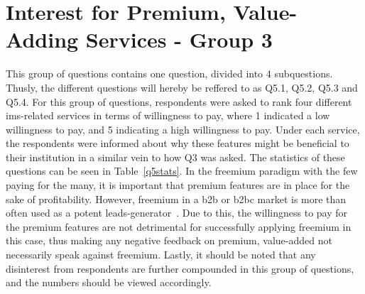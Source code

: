 \section{Interest for Premium, Value-Adding Services - Group 3}
This group of questions contains one question, divided into 4 subquestions. Thusly, the different questions will hereby be reffered to as Q5.1, Q5.2, Q5.3 and Q5.4. For this group of questions, respondents were asked to rank four different \gls{ims}-related services in terms of willingness to pay, where 1 indicated a low willingness to pay, and 5 indicating a high willingness to pay. Under each service, the respondents were informed about why these features might be beneficial to their institution in a similar vein to how Q3 was asked. The statistics of these questions can be seen in Table~\ref{q5stats}. In the freemium paradigm with the few paying for the many, it is important that premium features are in place for the sake of profitability. However, freemium in a \gls{b2b} or \gls{b2bc} market is more than often used as a potent leads-generator~\cite{jepson2009freemium}. Due to this, the willingness to pay for the premium features are not detrimental for successfully applying freemium in this case, thus making any negative feedback on premium, value-added not necessarily speak against freemium. Lastly, it should be noted that any disinterest from respondents are further compounded in this group of questions, and the numbers should be viewed accordingly.

\begin{table}[]
\centering
\caption{Statistics: Question Group 3}
\label{q5stats}
\end{table}


